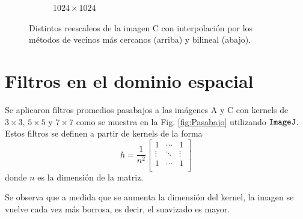 \documentclass[letterpaper,12pt]{article}
\theoremstyle{plain}
\begin{document}
\begin{figure}[H]
\begin{subfigure}[h]{0.24\textwidth}
            \caption{$1024\times1024$} 
         \end{subfigure}
    \caption{Distintos reescaleos de la imagen C con interpolación por los métodos de vecinos más cercanos (arriba) y bilineal (abajo).}
    \label{fig:Interpolate}
\end{figure}

\section{Filtros en el dominio espacial\label{sec:ej4}}

\vspace{0.3cm}

Se aplicaron filtros promedios pasabajos a las imágenes A y C con kernels de $3\times3$, $5\times5$ y $7\times7$ como se muestra en la Fig. \ref{fig:Pasabajo} utilizando $\verb|ImageJ|$. Estos filtros se definen a partir de kernels de la forma 
\begin{equation}
    h = \frac{1}{n^2} 
    \begin{bmatrix}
    1 & \cdots & 1 \\
    \vdots & \ddots & \vdots \\
    1 & \cdots & 1 \\
    \end{bmatrix}
\end{equation}
donde $n$ es la dimensión de la matriz. 

Se observa que a medida que se aumenta la dimensión del kernel, la imagen se vuelve cada vez más borrosa, es decir, el suavizado es mayor.
\end{document}
